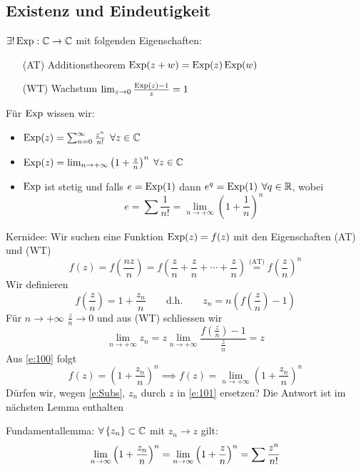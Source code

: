 \subsection{Existenz und Eindeutigkeit}
\begin{Sat}\label{s:Exp}
  $\exists ! \operatorname{Exp}:\mathbb{C}\to\mathbb{C}$ mit folgenden Eigenschaften:
  \begin{itemize}
    \item[(AT)] Additionstheorem $\operatorname{Exp}(z+w)=\operatorname{Exp}(z)\operatorname{Exp}(w)$
    \item[(WT)] Wachstum $\lim_{z\to 0}\frac{\operatorname{Exp}(z)-1}{z}=1$
  \end{itemize}
  Für $\operatorname{Exp}$ wissen wir:
  \begin{itemize}
    \item $\operatorname{Exp}(z)=\sum_{n=0}^\infty\frac{z^n}{n!}$ $\forall z\in\mathbb{C}$
    \item $\operatorname{Exp}(z)=\lim_{n\to+\infty}\left( 1+\frac{z}{n} \right)^n$ $\forall z\in \mathbb{C}$
    \item $\operatorname{Exp}$ ist stetig und falls $e=\operatorname{Exp}(1)$ dann $e^q=\operatorname{Exp}(1)$ $\forall q\in \mathbb{R}$,
wobei 
  \[e=\sum\frac{1}{n!}=\lim_{n\to+\infty}\left( 1+\frac{1}{n} \right)^n\]
 \end{itemize}
\end{Sat}
\begin{Bem}\label{b:Kern}
  Kernidee: Wir suchen eine Funktion $\operatorname{Exp}(z)=f(z)$ mit den Eigenschaften
(AT) und (WT)
\begin{equation}\label{e:100} f(z) = f\left(\frac{nz}{n}\right)=
f\left(\frac{z}{n}+\frac{z}{n}+\cdots+\frac{z}{n}\right)\stackrel{\text{(AT)}}{=}
f\left(\frac{z}{n}\right)^n
\end{equation}
Wir definieren
  \[f\left( \frac{z}{n} \right)=1+\frac{z_n}{n}\qquad
\mbox{d.h.} \qquad z_n = n \left(f\left(\frac{z}{n}\right) -1\right)\]
F\"ur  $n\to+\infty$ $\frac{z}{n}\to 0$ und aus (WT) schliessen wir
\begin{equation}\label{e:Subs}
\lim_{n\to+\infty}z_n=z\lim_{n\to+\infty}
\frac{f\left( \frac{z}{n} \right)-1}{\frac{z}{n}}=z
\end{equation}
Aus \eqref{e:100} folgt
\begin{equation}\label{e:101}
f(z)=\left( 1+\frac{z_n}{n}\right)^n\implies f(z)
=\lim_{n\to+\infty}\left( 1+\frac{z_n}{n}\right)^n
\end{equation}
D\"urfen wir, wegen \eqref{e:Subs}, $z_n$ durch $z$ in \eqref{e:101}
ersetzen? Die Antwort ist im n\"achsten Lemma enthalten
\end{Bem}
\begin{Lem}
  Fundamentallemma: $\forall \left\{ z_n \right\}\subset\mathbb{C}$ mit $z_n\to z$ gilt:
  \[\displaystyle\lim_{n\rightarrow\infty}\left( 1+\frac{z_n}{n}\right)^n=\displaystyle\lim_{n\rightarrow\infty}\left( 1+\frac{z}{n}\right)^n=\sum \frac{z^n}{n!}\]
\end{Lem}
